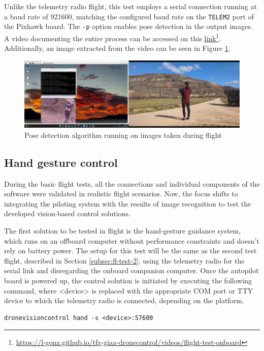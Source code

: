 Unlike the telemetry radio flight, this test employs a serial connection running at a baud rate of 921600, matching the configured baud rate on the \texttt{TELEM2} port of the Pixhawk board. The \texttt{-p} option enables pose detection in the output images. A video documenting the entire process can be accessed on this \href{https://l-gonz.github.io/tfg-giaa-dronecontrol/videos/flight-test-onboard}{link}\footnote{\url{https://l-gonz.github.io/tfg-giaa-dronecontrol/videos/flight-test-onboard}}. Additionally, an image extracted from the video can be seen in Figure \ref{fig:flight-test-cam-onboard}.


\begin{figure}
  \centering
  \includegraphics[width=\textwidth, keepaspectratio]{img/video-field-test-onboard.png}
  \caption{Pose detection algorithm running on images taken during flight}
  \label{fig:flight-test-cam-onboard}
\end{figure}


\subsection{Hand gesture control}
\label{subsec:fl-test-4}


During the basic flight tests, all the connections and individual components of the software were validated in realistic flight scenarios. Now, the focus shifts to integrating the piloting system with the results of image recognition to test the developed vision-based control solutions.

The first solution to be tested in flight is the hand-gesture guidance system, which runs on an offboard computer without performance constraints and doesn't rely on battery power. The setup for this test will be the same as the second test flight, described in Section \ref{subsec:fl-test-2}, using the telemetry radio for the serial link and disregarding the onboard companion computer. Once the autopilot board is powered up, the control solution is initiated by executing the following command, where <device> is replaced with the appropriate COM port or TTY device to which the telemetry radio is connected, depending on the platform.
\begin{verbatim}
dronevisioncontrol hand -s <device>:57600
\end{verbatim}


